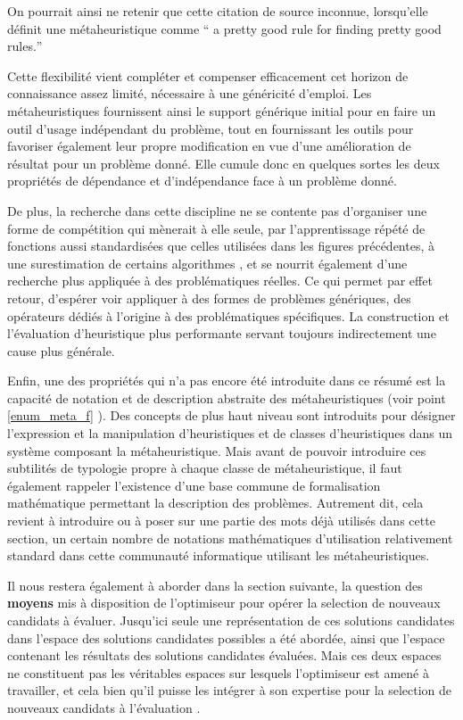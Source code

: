On pourrait ainsi ne retenir que cette citation de source inconnue, lorsqu'elle définit une métaheuristique comme \foreignquote{english}{ a pretty good rule for finding pretty good rules.}

Cette flexibilité vient compléter et compenser efficacement cet horizon de connaissance assez limité, nécessaire à une généricité d'emploi. Les métaheuristiques fournissent ainsi le support générique initial pour en faire un outil d'usage indépendant du problème, tout en fournissant les outils pour favoriser également leur propre modification en vue d'une amélioration de résultat pour un problème donné. Elle cumule donc en quelques sortes les deux propriétés de dépendance et d'indépendance face à un problème donné.

De plus, la recherche dans cette discipline ne se contente pas d'organiser une forme de compétition qui mènerait à elle seule, par l'apprentissage répété de fonctions aussi standardisées que celles utilisées dans les figures précédentes, à une surestimation de certains algorithmes , et se nourrit également d'une recherche plus appliquée à des problématiques réelles. Ce qui permet par effet retour, d'espérer voir appliquer à des formes de problèmes génériques, des opérateurs dédiés à l'origine à des problématiques spécifiques. La construction et l'évaluation d'heuristique plus performante servant toujours indirectement une cause plus générale.

Enfin, une des propriétés qui n'a pas encore été introduite dans ce résumé est la capacité de notation et de description abstraite des métaheuristiques (voir point \ref{enum_meta_f} ). Des concepts de plus haut niveau sont introduits pour désigner l'expression et la manipulation d'heuristiques et de classes d'heuristiques dans un système composant la métaheuristique. Mais avant de pouvoir introduire ces subtilités de typologie propre à chaque classe de métaheuristique, il faut également rappeler l'existence d'une base commune de formalisation mathématique permettant la description des problèmes. Autrement dit, cela revient à introduire ou à poser sur une partie des mots déjà utilisés dans cette section, un certain nombre de notations mathématiques d'utilisation relativement standard dans cette communauté informatique utilisant les métaheuristiques.

Il nous restera également à aborder dans la section suivante, la question des \textbf{moyens} mis à disposition de l'optimiseur pour opérer la selection de nouveaux candidats à évaluer. Jusqu'ici seule une représentation de ces solutions candidates dans l'espace des solutions candidates possibles a été abordée, ainsi que l'espace contenant les résultats des solutions candidates évaluées. Mais ces deux espaces ne constituent pas les véritables espaces sur lesquels l'optimiseur est amené à travailler, et cela bien qu'il puisse les intégrer à son expertise pour la selection de nouveaux candidats à l'évaluation .

